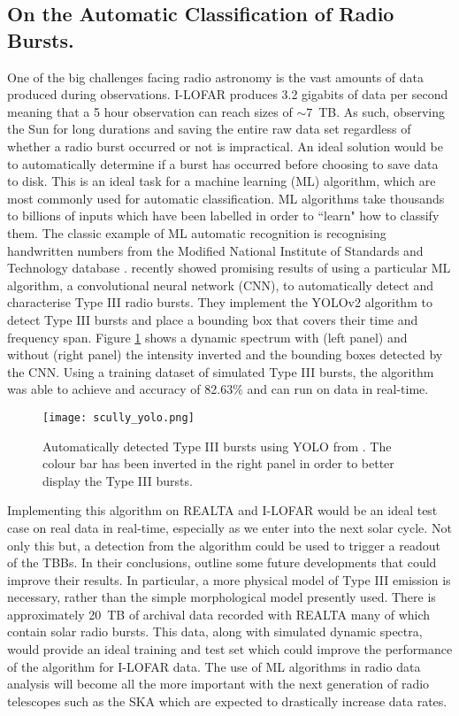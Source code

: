 \subsection{On the Automatic Classification of Radio Bursts.}
One of the big challenges facing radio astronomy is the vast amounts of data produced during observations. I-LOFAR produces 3.2 gigabits of data per second meaning that a 5 hour observation can reach sizes of $\sim 7$~TB. As such, observing the Sun for long durations and saving the entire raw data set regardless of whether a radio burst occurred or not is impractical. An ideal solution would be to automatically determine if a burst has occurred before choosing to save data to disk. 
This is an ideal task for a machine learning (ML) algorithm, which are most commonly used for automatic classification. ML algorithms take thousands to billions of inputs which have been labelled in order to ``learn" how to classify them. The classic example of ML automatic recognition is recognising handwritten numbers from the Modified National Institute of Standards and Technology database \citep[MNIST;][]{LeCun1998}.
\cite{Scully2021} recently showed promising results of using a particular ML algorithm, a convolutional neural network (CNN), to automatically detect and characterise Type III radio bursts. They implement the YOLOv2 \citep[You Only Look Once;][]{Yolo9000} algorithm to detect Type III bursts and place a bounding box that covers their time and frequency span. Figure \ref{fig:yolo} shows a dynamic spectrum with (left panel) and without (right panel) the intensity inverted and the bounding boxes detected by the CNN. Using a training dataset of simulated Type III bursts, the algorithm was able to achieve and accuracy of 82.63$\%$ and can run on data in real-time.  

\begin{figure}[ht]
\centering
\texttt{[image: scully\_yolo.png]}
\caption[Automatically detected Type III bursts using YOLO]{Automatically detected Type III bursts using YOLO from \cite{Scully2021}. The colour bar has been inverted in the right panel in order to better display the Type III bursts. }
\label{fig:yolo}
\end{figure}

Implementing this algorithm on REALTA and I-LOFAR would be an ideal test case on real data in real-time, especially as we enter into the next solar cycle. Not only this but, a detection from the algorithm could be used to trigger a readout of the TBBs.
In their conclusions, \cite{Scully2021} outline some future developments that could improve their results. In particular, a more physical model of Type III emission is necessary, rather than the simple morphological model presently used. There is approximately 20~TB of archival data recorded with REALTA many of which contain solar radio bursts. This data, along with simulated dynamic spectra, would provide an ideal training and test set which could improve the performance of the algorithm for I-LOFAR data. The use of ML algorithms in radio data analysis will become all the more important with the next generation of radio telescopes such as the SKA which are expected to drastically increase data rates.

